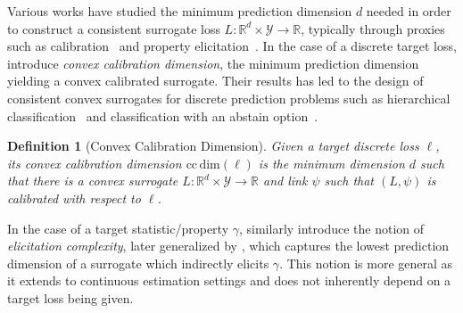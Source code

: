 \documentclass{article}
\newcommand{\Comments}{1}
\newcommand{\mytodo}[2]{\ifnum\Comments=1%
	\todo[linecolor=#1!80!black,backgroundcolor=#1,bordercolor=#1!80!black]{#2}\fi}
\newcommand{\raft}[1]{\mytodo{green!20!white}{RF: #1}}
\newcommand{\jessiet}[1]{\mytodo{purple!20!white}{JF: #1}}
\newcommand{\reals}{\mathbb{R}}
\newcommand{\ccdim}{\mathrm{cc\,dim}}
\newcommand{\Y}{\mathcal{Y}}
\newtheorem{definition}{Definition}
\begin{document}
Various works have studied the minimum prediction dimension $d$ needed in order to construct a consistent surrogate loss $L: \reals^d \times \Y \to \reals$, typically through proxies such as calibration~\citep{agarwal2015consistent,ramaswamy2016convex} and property elicitation~\citep{frongillo2015vector-valued,fissler2016higher,frongillo2018elicitation}.
In the case of a discrete target loss, \citet{ramaswamy2016convex} introduce \emph{convex calibration dimension}, the minimum prediction dimension yielding a convex calibrated surrogate.
Their results has led to the design of consistent convex surrogates for discrete prediction problems such as hierarchical classification~\citep{ramaswamy2015hierarchical} and classification with an abstain option~\citep{ramaswamy2018consistent}.

\begin{definition}[Convex Calibration Dimension]
	Given a target discrete loss $\ell$, its \emph{convex calibration dimension} $\ccdim(\ell)$ is the minimum dimension $d$ such that there is a convex surrogate \mbox{$L: \reals^d \times \Y \to \reals$} and link $\psi$ such that $(L,\psi)$ is calibrated with respect to $\ell$.
\end{definition}

In the case of a target statistic/property $\gamma$, \citet{lambert2008eliciting} similarly introduce the notion of \emph{elicitation complexity}, later generalized by \citet{frongillo2018elicitation}, which captures the lowest prediction dimension of a surrogate which indirectly elicits $\gamma$.
This notion is more general as it extends to continuous estimation settings and does not inherently depend on a target loss being given. 
\end{document}
